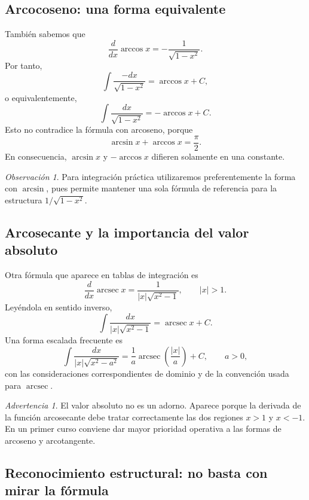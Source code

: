 \documentclass[12pt]{article}
\theoremstyle{definition}
\theoremstyle{remark}
\newtheorem*{observacion}{Observación}
\newtheorem*{advertencia}{Advertencia}
\begin{document}
\subsection*{Arcocoseno: una forma equivalente}

También sabemos que
\[
\frac{d}{dx}\arccos x=-\frac1{\sqrt{1-x^2}}.
\]
Por tanto,
\[
\int\frac{-dx}{\sqrt{1-x^2}}=\arccos x+C,
\]
o equivalentemente,
\[
\int\frac{dx}{\sqrt{1-x^2}}=-\arccos x+C.
\]
Esto no contradice la fórmula con arcoseno, porque
\[
\arcsin x+\arccos x=\frac\pi2.
\]
En consecuencia, $\arcsin x$ y $-\arccos x$ difieren solamente en una
constante.

\begin{observacion}
Para integración práctica utilizaremos preferentemente la forma con
$\arcsin$, pues permite mantener una sola fórmula de referencia para la
estructura $1/\sqrt{1-x^2}$.
\end{observacion}

\subsection*{Arcosecante y la importancia del valor absoluto}

Otra fórmula que aparece en tablas de integración es
\[
\frac{d}{dx}\operatorname{arcsec}x
=\frac1{|x|\sqrt{x^2-1}},\qquad |x|>1.
\]
Leyéndola en sentido inverso,
\[
\boxed{\int\frac{dx}{|x|\sqrt{x^2-1}}
=\operatorname{arcsec}x+C.}
\]
Una forma escalada frecuente es
\[
\boxed{\int\frac{dx}{|x|\sqrt{x^2-a^2}}
=\frac1a\operatorname{arcsec}\left(\frac{|x|}{a}\right)+C,\qquad a>0,}
\]
con las consideraciones correspondientes de dominio y de la convención usada
para $\operatorname{arcsec}$.

\begin{advertencia}
El valor absoluto no es un adorno. Aparece porque la derivada de la función
arcosecante debe tratar correctamente las dos regiones $x>1$ y $x<-1$. En un
primer curso conviene dar mayor prioridad operativa a las formas de arcoseno
y arcotangente.
\end{advertencia}

\subsection*{Reconocimiento estructural: no basta con mirar la fórmula}
\end{document}

